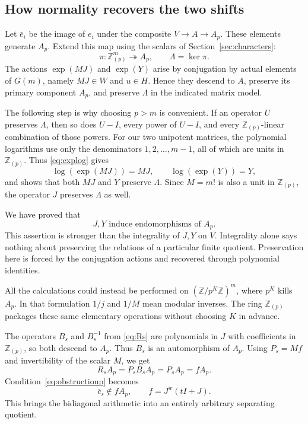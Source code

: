 \documentclass[11pt]{article}
\numberwithin{equation}{section}
\theoremstyle{definition}
\theoremstyle{remark}
\newcommand{\Z}{\mathbb Z}
\newcommand{\Rloc}{\mathbb Z_{(p)}}
\begin{document}
\subsection{How normality recovers the two shifts}
Let $\bar e_i$ be the image of $e_i$ under the composite $V\to A\to A_p$. These elements generate $A_p$. Extend this map using the scalars of Section~\ref{sec:characters}:
\[
\pi:\Rloc^m\twoheadrightarrow A_p,\qquad
\Lambda=\ker\pi.
\]
The actions $\exp(MJ)$ and $\exp(Y)$ arise by conjugation by actual elements of $G(m)$, namely $MJ\in W$ and $u\in H$. Hence they descend to $A$, preserve its primary component $A_p$, and preserve $\Lambda$ in the indicated matrix model.

The following step is why choosing $p>m$ is convenient. If an operator $U$ preserves $\Lambda$, then so does $U-I$, every power of $U-I$, and every $\Rloc$-linear combination of those powers. For our two unipotent matrices, the polynomial logarithms use only the denominators $1,2,\ldots,m-1$, all of which are units in $\Rloc$. Thus \eqref{eq:explog} gives
\[
\log(\exp(MJ))=MJ,\qquad
\log(\exp(Y))=Y,
\]
and shows that both $MJ$ and $Y$ preserve $\Lambda$. Since $M=m!$ is also a unit in $\Rloc$, the operator $J$ preserves $\Lambda$ as well.

We have proved that
\begin{equation}\label{eq:descendingJY}
J,Y\text{ induce endomorphisms of }A_p.
\end{equation}
This assertion is stronger than the integrality of $J,Y$ on $V$. Integrality alone says nothing about preserving the relations of a particular finite quotient. Preservation here is forced by the conjugation actions and recovered through polynomial identities.

All the calculations could instead be performed on $\left(\Z/p^K\Z\right)^m$, where $p^K$ kills $A_p$. In that formulation $1/j$ and $1/M$ mean modular inverses. The ring $\Rloc$ packages these same elementary operations without choosing $K$ in advance.

The operators $B_s$ and $B_s^{-1}$ from \eqref{eq:Rs} are polynomials in $J$ with coefficients in $\Rloc$, so both descend to $A_p$. Thus $B_s$ is an automorphism of $A_p$. Using $P_s=Mf$ and invertibility of the scalar $M$, we get
\[
R_sA_p=P_sB_sA_p=P_sA_p=fA_p.
\]
Condition~\eqref{eq:obstructionp} becomes
\begin{equation}\label{eq:obstructionf}
\bar c_s\notin fA_p,\qquad f=J^w(tI+J).
\end{equation}
This brings the bidiagonal arithmetic into an entirely arbitrary separating quotient.
\end{document}
